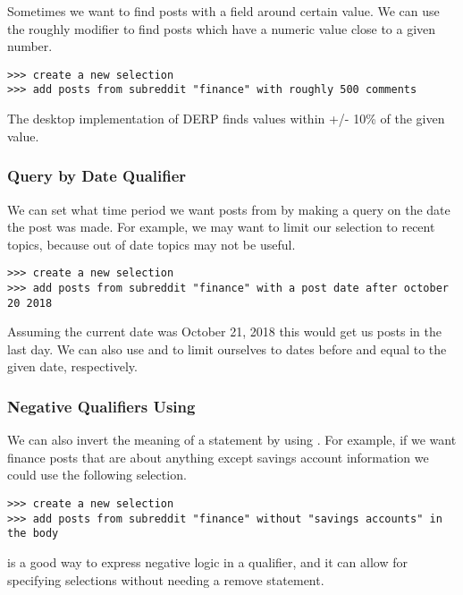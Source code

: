 Sometimes we want to find posts with a field around certain value. We can use the roughly modifier to find posts which have a numeric value close to a given number.
\newline\begin{minipage}{\linewidth}\begin{lstlisting}
>>> create a new selection
>>> add posts from subreddit "finance" with roughly 500 comments
\end{lstlisting}\end{minipage}
The desktop implementation of DERP finds values within +/- 10\% of the given value.


\subsubsection{Query by Date Qualifier}
We can set what time period we want posts from by making a query on the date the post was made. For example, we may want to limit our selection to recent topics, because out of date topics may not be useful.
\newline\begin{minipage}{\linewidth}\begin{lstlisting}
>>> create a new selection
>>> add posts from subreddit "finance" with a post date after october 20 2018
\end{lstlisting}\end{minipage}
Assuming the current date was October 21, 2018 this would get us posts in the last day. We can also use  and  to limit ourselves to dates before and equal to the given date, respectively.



\subsubsection{Negative Qualifiers Using }
We can also invert the meaning of a  statement by using . For example, if we want finance posts that are about anything except savings account information we could use the following selection.
\newline\begin{minipage}{\linewidth}\begin{lstlisting}
>>> create a new selection
>>> add posts from subreddit "finance" without "savings accounts" in the body
\end{lstlisting}\end{minipage}
 is a good way to express negative logic in a qualifier, and it can allow for specifying selections without needing a remove statement.



